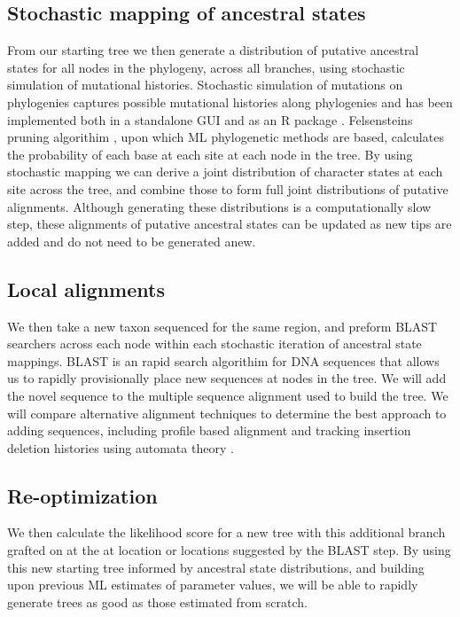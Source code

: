 \documentclass[10pt]{article}
\begin{document}
\subsection*{Stochastic mapping of ancestral states}
From our starting tree we then generate a distribution of putative ancestral states for all nodes in the phylogeny, across all branches, using stochastic simulation of mutational histories. Stochastic simulation of mutations on phylogenies captures possible mutational histories along phylogenies \cite{nielsen_mapping_2002}\cite{huelsenbeck_stochastic_2003} and has been implemented both in a standalone GUI \cite{bollback_simmap:_2006} and as an R package \cite{revell_phytools:_2012}. Felsensteins pruning algorithim \cite{felsenstein_evolutionary_1981}, upon which ML phylogenetic methods are based, calculates the probability of each base at each site at each node in the tree. By using stochastic mapping we can derive a joint distribution of character states at each site across the tree, and combine those to form full joint distributions of putative alignments. Although generating these distributions is a computationally slow step, these alignments of putative ancestral states can be updated as new tips are added and do not need to be generated anew. 

\subsection*{Local alignments}
We then take a new taxon sequenced for the same region, and preform BLAST searchers across each node within each stochastic iteration of ancestral state mappings. BLAST is an rapid search algorithim for DNA sequences that allows us to rapidly provisionally place new sequences at nodes in the tree. We will add the novel sequence to the multiple sequence alignment used to build the tree. We will compare alternative alignment techniques to determine the best approach to adding sequences, including profile based alignment \cite{loytynoja_accurate_2012} \cite{smith_mega-phylogeny_2009} and tracking insertion deletion histories using automata theory \cite{westesson_accurate_2012}. 

\subsection*{Re-optimization}
We then calculate the likelihood score for a new tree with this additional branch grafted on at the at location or locations suggested by the BLAST step. By using this new starting tree informed by ancestral state distributions, and building upon previous ML estimates of parameter values, we will be able to rapidly generate trees as good as those estimated from scratch. %
\end{document}
